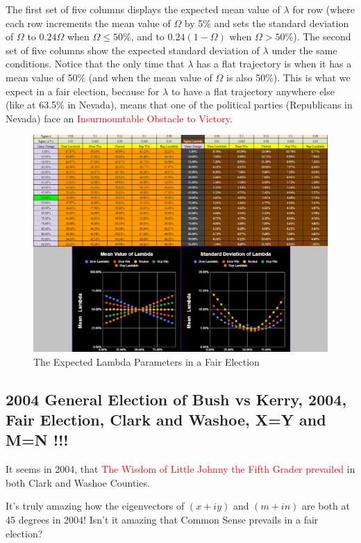 The first set of five columns displays the expected mean value of $\lambda$ for row (where each row increments the mean value of $\Omega$ by 5\% and sets the standard deviation of $\Omega$ to $0.24\Omega$ when $\Omega \le 50\%$, and to $0.24(1-\Omega)$ when $\Omega > 50\%$). The second set of five columns show the expected standard deviation of $\lambda$ under the same conditions. Notice that the only time that $\lambda$ has a flat trajectory is when it has a mean value of 50\% (and when the mean value of $\Omega$ is also 50\%). This is what we expect in a fair election, because for $\lambda$ to have a flat trajectory anywhere else (like at 63.5\% in Nevada), means that one of the political parties (Republicans in Nevada) face an \textcolor{red}{Insurmountable Obstacle to Victory}.
\begin{figure}[bp!]
\begin{center}
\caption{The Expected Lambda Parameters in a Fair Election}
\includegraphics[width=400pt]{FairLambdaStats.png}
\end{center}
\end{figure}
\newpage
\subsection{2004 General Election of Bush vs Kerry, 2004, Fair Election, Clark and Washoe, X=Y and M=N !!!}

It seems in 2004, that \textcolor{red}{The Wisdom of Little Johnny the Fifth Grader prevailed} in both Clark and Washoe Counties.  

It's truly amazing how the eigenvectors of $(x+iy)$ and $(m+in)$ are both at 45 degrees in 2004! Isn't it amazing that Common Sense prevails in a fair election? 


